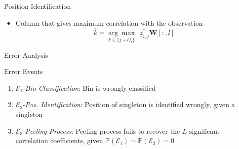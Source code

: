 \documentclass[10pt,xcolor=table]{beamer}
\newcommand{\mc}{\mathcal}
\newcommand{\mbb}{\mathbb}
\newcommand{\zv}{\underline{z}}
\begin{document}
\begin{frame}
{\begin{block}{Position Identification}
\begin{itemize}
			\item Column that gives {\color {blue} maximum correlation} with the observation\\
			{ \[\boxed{\hat{k} = \underset{k\in\{j+l f_i\}}{\arg \max}~~ \zv^{\dagger}_{i,j} \mathbf{W}[:,l]}\]}
		\end{itemize}
	
		\end{block}}

\end{frame}
\begin{frame}{Error Analysis}

\begin{block}{Error Events}
	\begin{enumerate}\small
		\item {\color{blue}$\mathcal{E}_1${-\it Bin Classification}}: Bin is wrongly classified
		\item {\color{blue}$\mathcal{E}_2${-\it Pos. Identification}}: Position of singleton is identified wrongly, given a singleton
		\item {\color{blue}$\mathcal{E}_3${-\it Peeling Process}}: Peeling process fails to recover the $L$ significant correlation coefficients, given $\mbb{P}(\mc{E}_1)= \mbb{P}(\mc{E}_2)=0$
	\end{enumerate}
\end{block}
\end{frame}
\end{document}
